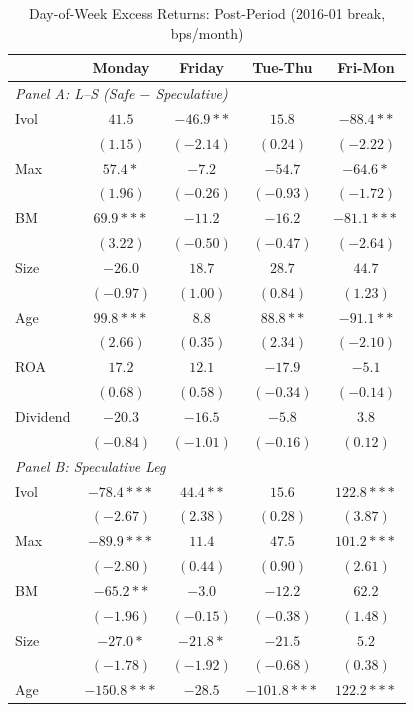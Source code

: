 \begin{table}[htbp]
\centering
\caption{Day-of-Week Excess Returns: Post-Period (2016-01 break, bps/month)}
\label{tab:split_201601_post}
\footnotesize
\begin{tabular}{l c c c c}
\toprule
 & Monday & Friday & Tue-Thu & Fri-Mon \\
\midrule
\multicolumn{5}{l}{\textit{Panel A: L--S (Safe $-$ Speculative)}} \\
Ivol & $41.5$ & $-46.9**$ & $15.8$ & $-88.4**$ \\
 & $(1.15)$ & $(-2.14)$ & $(0.24)$ & $(-2.22)$ \\
Max & $57.4*$ & $-7.2$ & $-54.7$ & $-64.6*$ \\
 & $(1.96)$ & $(-0.26)$ & $(-0.93)$ & $(-1.72)$ \\
BM & $69.9***$ & $-11.2$ & $-16.2$ & $-81.1***$ \\
 & $(3.22)$ & $(-0.50)$ & $(-0.47)$ & $(-2.64)$ \\
Size & $-26.0$ & $18.7$ & $28.7$ & $44.7$ \\
 & $(-0.97)$ & $(1.00)$ & $(0.84)$ & $(1.23)$ \\
Age & $99.8***$ & $8.8$ & $88.8**$ & $-91.1**$ \\
 & $(2.66)$ & $(0.35)$ & $(2.34)$ & $(-2.10)$ \\
ROA & $17.2$ & $12.1$ & $-17.9$ & $-5.1$ \\
 & $(0.68)$ & $(0.58)$ & $(-0.34)$ & $(-0.14)$ \\
Dividend & $-20.3$ & $-16.5$ & $-5.8$ & $3.8$ \\
 & $(-0.84)$ & $(-1.01)$ & $(-0.16)$ & $(0.12)$ \\
\midrule
\multicolumn{5}{l}{\textit{Panel B: Speculative Leg}} \\
Ivol & $-78.4***$ & $44.4**$ & $15.6$ & $122.8***$ \\
 & $(-2.67)$ & $(2.38)$ & $(0.28)$ & $(3.87)$ \\
Max & $-89.9***$ & $11.4$ & $47.5$ & $101.2***$ \\
 & $(-2.80)$ & $(0.44)$ & $(0.90)$ & $(2.61)$ \\
BM & $-65.2**$ & $-3.0$ & $-12.2$ & $62.2$ \\
 & $(-1.96)$ & $(-0.15)$ & $(-0.38)$ & $(1.48)$ \\
Size & $-27.0*$ & $-21.8*$ & $-21.5$ & $5.2$ \\
 & $(-1.78)$ & $(-1.92)$ & $(-0.68)$ & $(0.38)$ \\
Age & $-150.8***$ & $-28.5$ & $-101.8***$ & $122.2***$ \\

\end{tabular}
\end{table}

